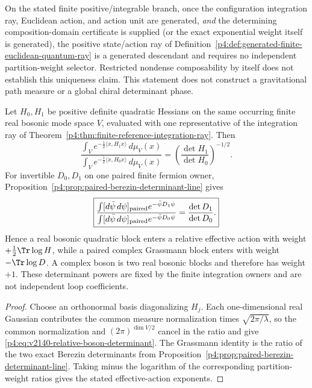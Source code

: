 \documentclass[12pt,a4paper]{article}
\begin{document}
\begin{corollary}
\label{p4:cor:finite-generated-quantum-constructor}
On the stated finite positive/integrable branch, once the configuration
integration ray, Euclidean action, and action unit are generated, \emph{and}
the determining composition-domain certificate is supplied (or the exact
exponential weight itself is generated), the positive state/action ray of
Definition~\ref{p4:def:generated-finite-euclidean-quantum-ray} is a generated
descendant and requires no independent partition-weight selector.  Restricted
nondense composability by itself does not establish this uniqueness claim.  This statement does not construct a gravitational path measure or
a global chiral determinant phase.
\end{corollary}

\begin{corollary}
\label{p4:cor:v2140-relative-determinant-weights}
Let $H_0,H_1$ be positive definite quadratic Hessians on the same occurring
finite real bosonic mode space $V$, evaluated with one representative of the
integration ray of Theorem~\ref{p4:thm:finite-reference-integration-ray}.
Then
\begin{equation}
\label{p4:eq:v2140-relative-boson-determinant}
 \boxed{
 \frac{\int_V e^{-\frac12\langle x,H_1x\rangle}\,d\mu_V(x)}
      {\int_V e^{-\frac12\langle x,H_0x\rangle}\,d\mu_V(x)}
 =\left(\frac{\det H_1}{\det H_0}\right)^{-1/2}.}
\end{equation}
For invertible $D_0,D_1$ on one paired finite fermion owner,
Proposition~\ref{p4:prop:paired-berezin-determinant-line} gives
\begin{equation}
\label{p4:eq:v2140-relative-grassmann-determinant}
 \boxed{
 \frac{\int[d\bar\psi\,d\psi]_{\rm paired}e^{-\bar\psi D_1\psi}}
      {\int[d\bar\psi\,d\psi]_{\rm paired}e^{-\bar\psi D_0\psi}}
 =\frac{\det D_1}{\det D_0}.}
\end{equation}
Hence a real bosonic quadratic block enters a relative effective action with
weight $+\tfrac12\Tr\log H$, while a paired complex Grassmann block enters
with weight $-\Tr\log D$.  A complex boson is two real bosonic blocks and
therefore has weight $+1$.  These determinant powers are fixed by the finite
integration owners and are not independent loop coefficients.
\end{corollary}

\begin{proof}
Choose an orthonormal basis diagonalizing $H_j$.  Each one-dimensional real
Gaussian contributes the common measure normalization times
$\sqrt{2\pi/\lambda}$, so the common normalization and $(2\pi)^{\dim V/2}$
cancel in the ratio and give
\eqref{p4:eq:v2140-relative-boson-determinant}.  The Grassmann identity is the
ratio of the two exact Berezin determinants from
Proposition~\ref{p4:prop:paired-berezin-determinant-line}.  Taking minus the
logarithm of the corresponding partition-weight ratios gives the stated
effective-action exponents.
\end{proof}
\end{document}
